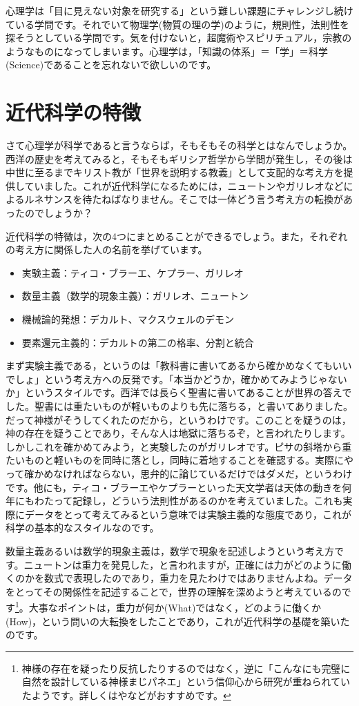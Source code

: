 \documentclass{ltjsbook}
\begin{document}
心理学は「目に見えない対象を研究する」という難しい課題にチャレンジし続けている学問です。それでいて物理学(物質の理の学)のように，規則性，法則性を探そうとしている学問です。気を付けないと，超魔術やスピリチュアル，宗教のようなものになってしまいます。心理学は，「知識の体系」＝「学」＝科学(Science)であることを忘れないで欲しいのです。

\section{近代科学の特徴} 

さて心理学が科学であると言うならば，そもそもその科学とはなんでしょうか。西洋の歴史を考えてみると，そもそもギリシア哲学から学問が発生し，その後は中世に至るまでキリスト教が「世界を説明する教義」として支配的な考え方を提供していました。これが近代科学になるためには，ニュートンやガリレオなどによるルネサンスを待たねばなりません。そこでは一体どう言う考え方の転換があったのでしょうか？

近代科学の特徴は，次の4つにまとめることができるでしょう。また，それぞれの考え方に関係した人の名前を挙げています。
\begin{itemize}
\item 実験主義：ティコ・ブラーエ、ケプラー、ガリレオ
\item 数量主義（数学的現象主義）：ガリレオ、ニュートン
\item 機械論的発想：デカルト、マクスウェルのデモン
\item 要素還元主義的：デカルトの第二の格率、分割と統合
\end{itemize}

まず実験主義である，というのは「教科書に書いてあるから確かめなくてもいいでしょ」という考え方への反発です。「本当かどうか，確かめてみようじゃないか」というスタイルです。西洋では長らく聖書に書いてあることが世界の答えでした。聖書には重たいものが軽いものよりも先に落ちる，と書いてありました。だって神様がそうしてくれたのだから，というわけです。このことを疑うのは，神の存在を疑うことであり，そんな人は地獄に落ちるぞ，と言われたりします。しかしこれを確かめてみよう，と実験したのがガリレオです。ピサの斜塔から重たいものと軽いものを同時に落とし，同時に着地することを確認する。実際にやって確かめなければならない，思弁的に論じているだけではダメだ，というわけです。他にも，ティコ・ブラーエやケプラーといった天文学者は天体の動きを何年にもわたって記録し，どういう法則性があるのかを考えていました。これも実際にデータをとって考えてみるという意味では実験主義的な態度であり，これが科学の基本的なスタイルなのです。

数量主義あるいは数学的現象主義は，数学で現象を記述しようという考え方です。ニュートンは重力を発見した，と言われますが，正確には力がどのように働くのかを数式で表現したのであり，重力を見たわけではありませんよね。データをとってその関係性を記述することで，世界の理解を深めようと考えているのです\footnote{神様の存在を疑ったり反抗したりするのではなく，逆に「こんなにも完璧に自然を設計している神様まじパネエ」という信仰心から研究が重ねられていたようです。詳しくは\citet{池内了2014}や\citet{蛇蔵2014}などがおすすめです。}。大事なポイントは，重力が何か(What)ではなく，どのように働くか(How)，という問いの大転換をしたことであり，これが近代科学の基礎を築いたのです。
\end{document}
